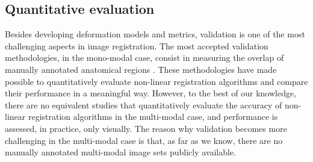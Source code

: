 \vspace{-0.2cm}
\subsection{Quantitative evaluation}
Besides developing deformation models and metrics, validation is one of the most challenging aspects in image registration. The most accepted validation methodologies, in the mono-modal case, consist in measuring the overlap of manually annotated anatomical regions \cite{Klein2009, Klein2010, Rohlfing2012}. These methodologies have made possible to quantitatively evaluate non-linear registration algorithms and compare their performance in a meaningful way. However, to the best of our knowledge, there are no equivalent studies that quantitatively evaluate the accuracy of non-linear registration algorithms in the multi-modal case, and performance is assessed, in practice, only visually. The reason why validation becomes more challenging in the multi-modal case is that, as far as we know, there are no manually annotated multi-modal image sets publicly available.

\vspace{-0.2cm}
